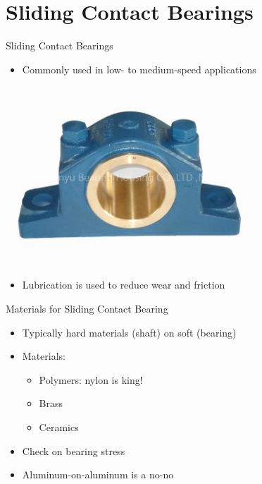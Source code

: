 \documentclass[10pt, svgnames]{beamer}
\begin{document}
\section{Sliding Contact Bearings}
\label{sec:orgf568ff4}

\begin{frame}[label={sec:org9c37f09}]{Sliding Contact Bearings}
\begin{itemize}
\item Commonly used in low- to medium-speed applications
\end{itemize}

\begin{center}
\includegraphics[width=0.7\textwidth]{./pictures/sliding-contact-bearing.jpg}
\end{center}

\begin{itemize}
\item Lubrication is used to reduce wear and friction
\end{itemize}
\end{frame}

\begin{frame}[label={sec:org2a937bc}]{Materials for Sliding Contact Bearing}
\begin{itemize}
\item Typically hard materials (shaft) on soft (bearing)
\item Materials:
\begin{itemize}
\item Polymers: nylon is king!
\item Brass
\item Ceramics
\end{itemize}
\item Check on bearing stress
\item Aluminum-on-aluminum is a no-no
\end{itemize}
\end{frame}
\end{document}
